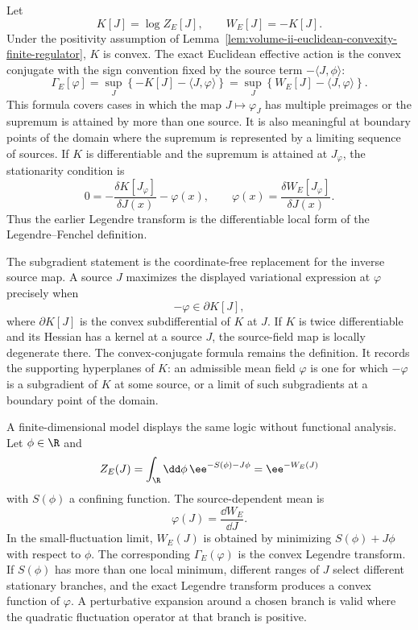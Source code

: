 Let
\[
  K[J]=\log Z_E[J],
  \qquad
  W_E[J]=-K[J].
\]
Under the positivity assumption of
Lemma~\ref{lem:volume-ii-euclidean-convexity-finite-regulator}, \(K\) is
convex.  The exact Euclidean effective action is the convex conjugate with the
sign convention fixed by the source term \(-\langle J,\phi\rangle\):
\[
  \Gamma_E[\varphi]
  =
  \sup_J
  \left\{
    -K[J]-\langle J,\varphi\rangle
  \right\}
  =
  \sup_J
  \left\{
    W_E[J]-\langle J,\varphi\rangle
  \right\}.
\]
This formula covers cases in which the map \(J\mapsto\varphi_J\) has multiple
preimages or the supremum is attained by more than one source.
It is also meaningful at boundary points of the domain where the supremum is
represented by a limiting sequence of sources.
If \(K\) is differentiable and the supremum is attained at \(J_\varphi\), the
stationarity condition is
\[
  0
  =
  -\frac{\delta K[J_\varphi]}{\delta J(x)}
  -
  \varphi(x),
  \qquad
  \varphi(x)
  =
  \frac{\delta W_E[J_\varphi]}{\delta J(x)} .
\]
Thus the earlier Legendre transform is the differentiable local form of the
Legendre--Fenchel definition.

The subgradient statement is the coordinate-free replacement for the inverse
source map.  A source \(J\) maximizes the displayed variational expression at
\(\varphi\) precisely when
\[
  -\varphi
  \in
  \partial K[J],
\]
where \(\partial K[J]\) is the convex subdifferential of \(K\) at \(J\).  If
\(K\) is twice differentiable and its Hessian has a kernel at a source \(J\),
the source-field map is locally degenerate there.  The convex-conjugate
formula remains the definition.  It records the supporting hyperplanes of
\(K\): an admissible mean field \(\varphi\) is one for which \(-\varphi\) is a
subgradient of \(K\) at some source, or a limit of such subgradients at a
boundary point of the domain.

A finite-dimensional model displays the same logic without functional
analysis.  Let \(\phi\in\R\) and
\[
  Z_E(J)=\int_{\R}\dd\phi\,\ee^{-S(\phi)-J\phi}
  =
  \ee^{-W_E(J)}
\]
with \(S(\phi)\) a confining function.  The source-dependent mean is
\[
  \varphi(J)=\frac{\dd W_E}{\dd J}.
\]
In the small-fluctuation limit, \(W_E(J)\) is obtained by minimizing
\(S(\phi)+J\phi\) with respect to \(\phi\).  The corresponding
\(\Gamma_E(\varphi)\) is the convex Legendre transform.  If \(S(\phi)\) has
more than one local minimum, different ranges of \(J\) select different
stationary branches, and the exact Legendre transform produces a convex
function of \(\varphi\).  A perturbative expansion around a chosen branch is
valid where the quadratic fluctuation operator at that branch is positive.

